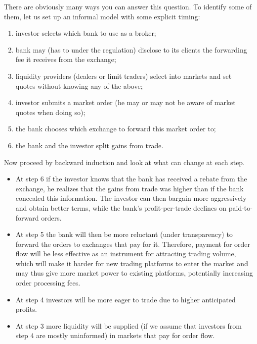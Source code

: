 \documentclass[11pt
, answers
]{exam}
\begin{document}
\begin{solution}
	There are obviously many ways you can answer this question. To identify some of them, let us set up an informal model with some explicit timing:
	\begin{enumerate}
		\item investor selects which bank to use as a broker;
		\item bank may (has to under the regulation) disclose to its clients the forwarding fee it receives from the exchange;
		\item liquidity providers (dealers or limit traders) select into markets and set quotes without knowing any of the above;
		\item investor submits a market order (he may or may not be aware of market quotes when doing so);
		\item the bank chooses which exchange to forward this market order to;
		\item the bank and the investor split gains from trade.
	\end{enumerate}
	
	Now proceed by backward induction and look at what can change at each step.
	\begin{itemize}[nolistsep,noitemsep]
		\item At step 6 if the investor knows that the bank has received a rebate from the exchange, he realizes that the gains from trade was higher than if the bank concealed this information. The investor can then bargain more aggressively and obtain better terms, while the bank's profit-per-trade declines on paid-to-forward orders.
		
		\item At step 5 the bank will then be more reluctant (under transparency) to forward the orders to exchanges that pay for it. Therefore, payment for order flow will be less effective as an instrument for attracting trading volume, which will make it harder for new trading platforms to enter the market and may thus give more market power to existing platforms, potentially increasing order processing fees.
		
		\item At step 4 investors will be more eager to trade due to higher anticipated profits.
		
		\item At step 3 more liquidity will be supplied (if we assume that investors from step 4 are mostly uninformed) in markets that pay for order flow.
		

\end{itemize}
\end{solution}
\end{document}
